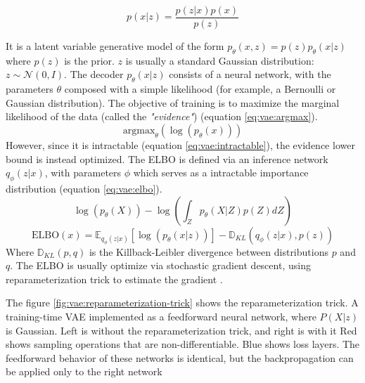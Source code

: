 \documentclass[12pt]{report}
\begin{document}
\begin{equation}
    p(x|z) = \frac{p(z|x) p(x)}{p(z)}
    \label{eq:bayesian-theorem}
\end{equation}

It is a latent variable generative model of the form $p_{\theta}(x, z) = p(z)p_{\theta}(x|z)$ where $p(z)$ is the prior.
$z$ is usually a standard Gaussian distribution: $z \sim \mathcal{N} (0, I)$.
The decoder $p_{\theta}(x|z)$ consists of a neural network, with the parameters $\theta$ composed with a simple likelihood (for example, a Bernoulli or Gaussian distribution).
The objective of training is to maximize the marginal likelihood of the data (called the \textit{"evidence"}) (equation \ref{eq:vae:argmax}).
\begin{equation}
    \text{argmax}_{\theta} (\log(p_{\theta} (x)))
    \label{eq:vae:argmax}
\end{equation}
However, since it is intractable (equation \ref{eq:vae:intractable}), the evidence lower bound is instead optimized. The ELBO is defined via an inference network $q_{\phi}(z|x)$, with parameters $\phi$ which serves as a intractable importance distribution (equation \ref{eq:vae:elbo}).
\begin{equation}
    \log (p_{\theta} (X)) - \log \left( \int_{Z} p_{\theta} (X|Z) p(Z) dZ\right)
    \label{eq:vae:intractable}
\end{equation}
\begin{equation}
    \text{ELBO}(x) = \mathbb{E}_{q_{\phi}(z|x)} \left[ \log (p_{\theta}(x|z)) \right] - \mathbb{D}_{KL} \left( q_{\phi}(z|x), p(z) \right)
    \label{eq:vae:elbo}
\end{equation}
Where $\mathbb{D}_{KL}(p, q)$ is the Killback-Leibler divergence between distributions $p$ and $q$.
The ELBO is usually optimize via stochastic gradient descent, using reparameterization trick to estimate the gradient \cite{kingma_auto-encoding_2014}.

The figure \ref{fig:vae:reparameterization-trick} shows the reparameterization trick.
A training-time VAE implemented as a feedforward neural network, where $P(X|z)$ is Gaussian.
Left is without the reparameterization trick, and right is with it
Red shows sampling operations that are non-differentiable.
Blue shows loss layers.
The feedforward behavior of these networks is identical, but the backpropagation can be applied only to the right network
\end{document}
